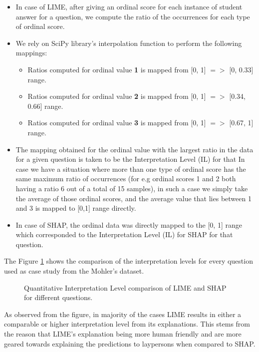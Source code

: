 \documentclass[letterpaper, 10 pt, conference]{ieeeconf}  %
\begin{document}
\begin{itemize}
\item In case of LIME, after giving an ordinal score for each instance of student answer for a question, we compute the ratio of the occurrences for each type of ordinal score.
\item We rely on  SciPy library’s interpolation function to perform the following mappings:
\begin{itemize}
\item Ratios computed for ordinal value \textbf{1} is mapped from [0, 1] $=>$ [0, 0.33] range.
\item Ratios computed for ordinal value \textbf{2} is mapped from [0, 1] $=>$ [0.34, 0.66] range.
\item Ratios computed for ordinal value \textbf{3} is mapped from [0, 1] $=>$ [0.67, 1] range. 
\end{itemize}
\item The mapping obtained for the ordinal value with the largest ratio in the data for a given question is taken to be the Interpretation Level (IL) for that In case we have a situation where more than one type of ordinal score has the same maximum ratio of occurrences (for e.g ordinal scores 1 and 2 both having a ratio 6 out of a total of 15 samples), in such a case we simply take the average of those ordinal scores, and the average value that lies between 1 and 3 is mapped to [0,1] range directly. 
\item In case of SHAP, the ordinal data was directly mapped to the [0, 1] range which corresponded to the Interpretation Level (IL) for SHAP for that question.
\end{itemize}
The Figure  \ref{fig:comparison1} shows the comparison of the interpretation levels for every question used as case study from the Mohler's dataset.
\begin{figure}[H]
\caption{Quantitative Interpretation Level comparison of LIME and SHAP for different questions.}
\label{fig:comparison1}
\end{figure}
As observed from the figure, in majority of the cases LIME results in either a comparable or higher interpretation level from its explanations. This stems from the reason that LIME's explanation being more human friendly and are more geared towards explaining the predictions to laypersons when compared to SHAP.
\end{document}
